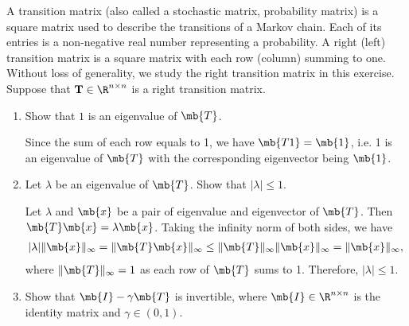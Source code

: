 \begin{exercise}
    A transition matrix (also called a stochastic matrix, probability matrix) is a square matrix used to describe the transitions of a Markov chain.
    Each of its entries is a non-negative real number representing a probability.
    A right (left) transition matrix is a square matrix with each row (column) summing to one.
    Without loss of generality, we study the right transition matrix in this exercise.
    Suppose that $\textbf{T} \in \R^{n \times n}$ is a right transition matrix.
    \begin{enumerate}
        \item
            Show that $1$ is an eigenvalue of $\mb{T}$.

            \begin{solution}
                Since the sum of each row equals to 1, we have $\mb{T1}=\mb{1}$, i.e. 1 is an eigenvalue of $\mb{T}$ with the corresponding eigenvector being $\mb{1}$.
                \qedhere
            \end{solution}
        \item
            Let $\lambda$ be an eigenvalue of $\mb{T}$. Show that $|\lambda|\le 1$.

            \begin{solution}
                Let $\lambda$ and $\mb{x}$ be a pair of eigenvalue and eigenvector of $\mb{T}$. Then $\mb{T}\mb{x}=\lambda\mb{x}$. Taking the infinity norm of both sides, we have
                \begin{align*}
                    |\lambda|\|\mb{x}\|_\infty = \|\mb{T}\mb{x}\|_\infty \le \|\mb{T}\|_\infty\|\mb{x}\|_\infty = \|\mb{x}\|_\infty,
                \end{align*}
                where $\|\mb{T}\|_\infty = 1$ as each row of $\mb{T}$ sums to 1. Therefore, $|\lambda|\le 1$.
                \qedhere
            \end{solution}
        \item
            Show that $\mb{I}-\gamma \mb{T}$ is invertible, where $\mb{I}\in \R^{n\times n}$ is the identity matrix and $\gamma\in(0,1)$.


\end{enumerate}
\end{exercise}
